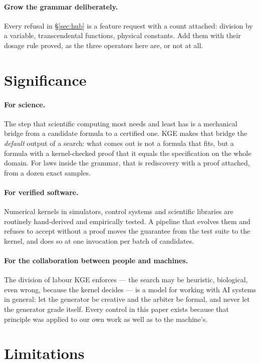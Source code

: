 \documentclass[11pt,a4paper]{article}
\theoremstyle{definition}
\theoremstyle{remark}
\begin{document}
\paragraph{Grow the grammar deliberately.} Every refusal in \S\ref{sec:hub} is a
feature request with a count attached: division by a variable, transcendental
functions, physical constants. Add them with their dosage rule proved, as the
three operators here are, or not at all.

\section{Significance}\label{sec:significance}

\paragraph{For science.} The step that scientific computing most needs and least
has is a mechanical bridge from a candidate formula to a certified one. KGE
makes that bridge the \emph{default} output of a search: what comes out is not a
formula that fits, but a formula with a kernel-checked proof that it equals the
specification on the whole domain. For laws inside the grammar, that is
rediscovery with a proof attached, from a dozen exact samples.

\paragraph{For verified software.} Numerical kernels in simulators, control
systems and scientific libraries are routinely hand-derived and empirically
tested. A pipeline that evolves them and refuses to accept without a proof moves
the guarantee from the test suite to the kernel, and does so at one invocation
per batch of candidates.

\paragraph{For the collaboration between people and machines.} The division of
labour KGE enforces --- the search may be heuristic, biological, even wrong,
because the kernel decides --- is a model for working with AI systems in general:
let the generator be creative and the arbiter be formal, and never let the
generator grade itself. Every control in this paper exists because that
principle was applied to our own work as well as to the machine's.

\section{Limitations}
\end{document}
